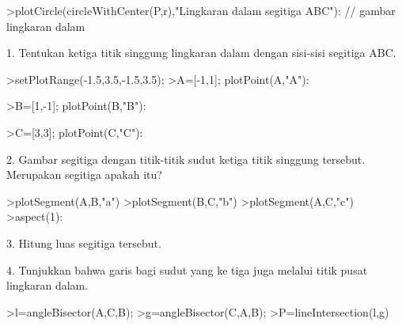 \documentclass[a4paper,10pt]{article}
\begin{document}
\begin{eulernotebook}
\begin{eulercomment}
\begin{eulercomment}
\begin{eulercomment}
\begin{eulercomment}
\begin{eulercomment}
\begin{eulercomment}
\begin{eulercomment}
\begin{eulercomment}
\begin{eulercomment}
\begin{eulercomment}
\begin{eulercomment}
\begin{eulercomment}
\begin{eulercomment}
\begin{eulercomment}
\begin{eulercomment}
\begin{eulercomment}
\begin{eulercomment}
\begin{eulercomment}
\begin{eulercomment}
\begin{eulercomment}
\begin{eulercomment}
\begin{eulercomment}
\begin{eulercomment}
\begin{eulercomment}
\begin{eulercomment}
\begin{eulercomment}
\begin{eulercomment}
\begin{eulercomment}
\begin{eulercomment}
\begin{eulercomment}
\begin{eulerprompt}
>plotCircle(circleWithCenter(P,r),"Lingkaran dalam segitiga ABC"): // gambar lingkaran dalam
\end{eulerprompt}
\begin{eulercomment}
1. Tentukan ketiga titik singgung lingkaran dalam dengan sisi-sisi
segitiga ABC.
\end{eulercomment}
\begin{eulerprompt}
>setPlotRange(-1.5,3.5,-1.5,3.5);
>A=[-1,1]; plotPoint(A,"A"):
\end{eulerprompt}
\begin{eulerprompt}
>B=[1,-1]; plotPoint(B,"B"):
\end{eulerprompt}
\begin{eulerprompt}
>C=[3,3]; plotPoint(C,"C"):
\end{eulerprompt}
\begin{eulercomment}
2. Gambar segitiga dengan titik-titik sudut ketiga titik singgung
tersebut. Merupakan segitiga apakah itu?
\end{eulercomment}
\begin{eulerprompt}
>plotSegment(A,B,"a")
>plotSegment(B,C,"b")
>plotSegment(A,C,"c")
>aspect(1):
\end{eulerprompt}
\begin{eulercomment}
3. Hitung luas segitiga tersebut.
\end{eulercomment}
\begin{eulercomment}
4. Tunjukkan bahwa garis bagi sudut yang ke tiga juga melalui titik
pusat lingkaran dalam.
\end{eulercomment}
\begin{eulerprompt}
>l=angleBisector(A,C,B);
>g=angleBisector(C,A,B);
>P=lineIntersection(l,g)
\end{eulerprompt}
\begin{euleroutput}
  [0.720759,  0.720759]

\end{euleroutput}
\end{eulercomment}
\end{eulercomment}
\end{eulercomment}
\end{eulercomment}
\end{eulercomment}
\end{eulercomment}
\end{eulercomment}
\end{eulercomment}
\end{eulercomment}
\end{eulercomment}
\end{eulercomment}
\end{eulercomment}
\end{eulercomment}
\end{eulercomment}
\end{eulercomment}
\end{eulercomment}
\end{eulercomment}
\end{eulercomment}
\end{eulercomment}
\end{eulercomment}
\end{eulercomment}
\end{eulercomment}
\end{eulercomment}
\end{eulercomment}
\end{eulercomment}
\end{eulercomment}
\end{eulercomment}
\end{eulercomment}
\end{eulercomment}
\end{eulercomment}
\end{eulernotebook}
\end{document}
